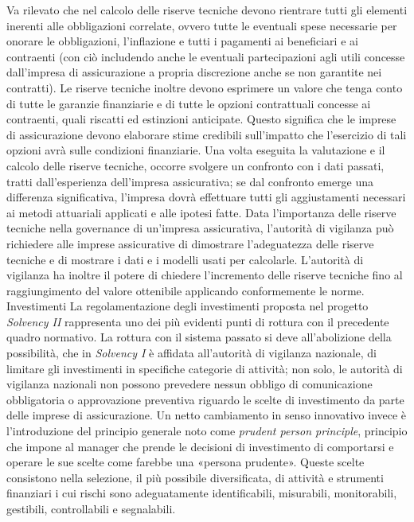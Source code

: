Va rilevato che nel calcolo delle riserve tecniche devono rientrare tutti gli elementi inerenti alle obbligazioni correlate, ovvero tutte le eventuali spese necessarie per onorare le obbligazioni, l’inflazione e tutti i pagamenti ai beneficiari e ai contraenti (con ciò includendo anche le eventuali partecipazioni agli utili concesse dall’impresa di assicurazione a propria discrezione anche se non garantite nei contratti).
Le riserve tecniche inoltre devono esprimere un valore che tenga conto di tutte le garanzie finanziarie e di tutte le opzioni contrattuali concesse ai contraenti, quali riscatti ed estinzioni anticipate. Questo significa che le imprese di assicurazione devono elaborare stime credibili sull’impatto che l’esercizio di tali opzioni avrà sulle condizioni finanziarie.
Una volta eseguita la valutazione e il calcolo delle riserve tecniche, occorre svolgere un confronto con i dati passati, tratti dall’esperienza dell’impresa assicurativa; se dal confronto emerge una differenza significativa, l’impresa dovrà effettuare tutti gli aggiustamenti necessari ai metodi attuariali applicati e alle ipotesi fatte.
Data l’importanza delle riserve tecniche nella governance di un’impresa assicurativa, l’autorità di vigilanza può richiedere alle imprese assicurative di dimostrare l’adeguatezza delle riserve tecniche e di mostrare i dati e i modelli usati per calcolarle. L’autorità di vigilanza ha inoltre il potere di chiedere l’incremento delle riserve tecniche fino al raggiungimento del valore ottenibile applicando conformemente le norme.
Investimenti
La regolamentazione degli investimenti proposta nel progetto \textit{\textit{Solvency I}I} rappresenta uno dei più evidenti punti di rottura con il precedente quadro normativo. La rottura con il sistema passato si deve all’abolizione della possibilità, che in \textit{Solvency I} è affidata all’autorità di vigilanza nazionale, di limitare gli investimenti in specifiche categorie di attività; non solo, le autorità di vigilanza nazionali non possono prevedere nessun obbligo di comunicazione obbligatoria o approvazione preventiva riguardo le scelte di investimento da parte delle imprese di assicurazione. Un netto cambiamento in senso innovativo invece è l’introduzione del principio generale noto come {\itshape prudent person principle}, principio che impone al manager che prende le decisioni di investimento di comportarsi e operare le sue scelte come farebbe una «persona prudente». Queste scelte consistono nella selezione, il più possibile diversificata, di attività e strumenti finanziari i cui rischi sono adeguatamente identificabili, misurabili, monitorabili, gestibili, controllabili e segnalabili.
